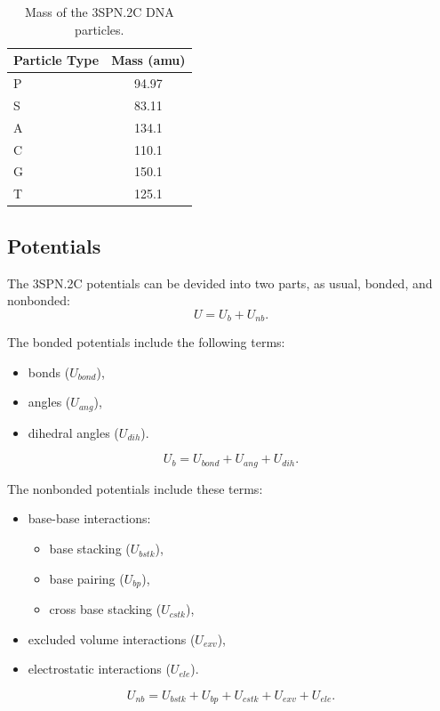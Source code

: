 \begin{table}[ht]
  \centering
  \begin{tabular}{lc}
    \toprule
    Particle Type    & Mass (amu) \\
    \midrule
    P  &  94.97 \\
    S  &  83.11 \\
    A  &  134.1 \\
    C  &  110.1 \\
    G  &  150.1 \\
    T  &  125.1 \\
    \bottomrule
  \end{tabular}
  \caption{Mass of the 3SPN.2C DNA particles.}
  \label{tab:dna_3spn2c_top_mass}
\end{table}

\subsection{Potentials}
\label{subsec:dna_3spn2c_potential}

The 3SPN.2C potentials can be devided into two parts, as usual, bonded, and
nonbonded:
\begin{displaymath}
  U = U_b + U_{nb}.
\end{displaymath}

The bonded potentials include the following terms:
\begin{itemize}
\item bonds ($U_{bond}$),
\item angles ($U_{ang}$),
\item dihedral angles ($U_{dih}$).
\end{itemize}
\begin{equation}
  \label{eq:dna_3spn2c_local}
  U_b = U_{bond} + U_{ang} + U_{dih}.
\end{equation}

The nonbonded potentials include these terms:
\begin{itemize}
\item base-base interactions:
  \begin{itemize}
  \item base stacking ($U_{bstk}$),
  \item base pairing ($U_{bp}$),
  \item cross base stacking ($U_{cstk}$),
  \end{itemize}
\item excluded volume interactions ($U_{exv}$),
\item electrostatic interactions ($U_{ele}$).
\end{itemize}
\begin{equation}
  \label{eq:dna_3spn2c_nonlocal}
  U_{nb} = U_{bstk} + U_{bp} + U_{cstk} + U_{exv} + U_{ele}.
\end{equation}


